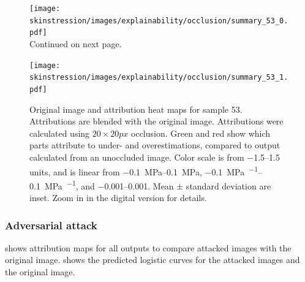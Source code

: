 \begin{figure}
    \ContinuedFloat
    \centering
    \texttt{[image: skinstression/images/explainability/occlusion/summary\_53\_0.pdf]} \\
    \raggedleft Continued on next page.
\end{figure}
\begin{figure}
    \centering
    \texttt{[image: skinstression/images/explainability/occlusion/summary\_53\_1.pdf]}
    \caption[Original image and attribution heat maps for sample 53]{
        Original image and attribution heat maps for sample 53.
        Attributions are blended with the original image.
        Attributions were calculated using $20\times 20\unit{px}$ occlusion.
        Green and red show which parts attribute to under- and overestimations, compared to output calculated from an unoccluded image.
        Color scale is from \numrange{-1.5}{1.5} units, and is linear from \qtyrange{-0.1}{0.1}{\mega\pascal}, \qtyrange{-0.1}{0.1}{\mega\pascal\per\stretch}, and \qtyrange{-0.001}{0.001}{\stretch}.
        Mean $\pm$ standard deviation are inset.
        Zoom in in the digital version for details.
    }
    \label{fig:skin_occlusion_53}
\end{figure}

\subsubsection{Adversarial attack}
 shows attribution maps for all outputs to compare attacked images with the original image.
 shows the predicted logistic curves for the attacked images and the original image.

